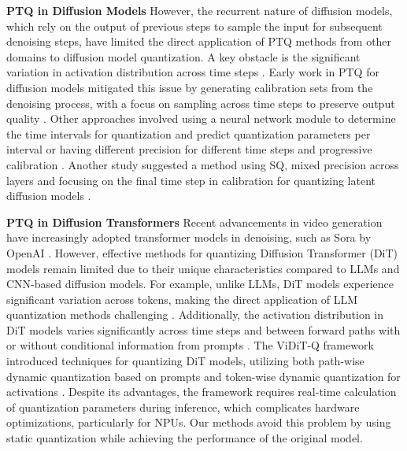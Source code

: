 \textbf{PTQ in Diffusion Models}
However, the recurrent nature of diffusion models, which rely on the output of previous steps to sample the input for subsequent denoising steps, have limited the direct application of PTQ methods from other domains to diffusion model quantization. A key obstacle is the significant variation in activation distribution across time steps \cite{shang2023posttrainingquantizationdiffusionmodels}. Early work in PTQ for diffusion models mitigated this issue by generating calibration sets from the denoising process, with a focus on sampling across time steps to preserve output quality \cite{shang2023posttrainingquantizationdiffusionmodels, li2023qdiffusionquantizingdiffusionmodels,liu2024enhanceddistributionalignmentposttraining}. Other approaches involved using a neural network module to determine the time intervals for quantization and predict quantization parameters per interval or having different precision for different time steps and progressive calibration \cite{so2023temporaldynamicquantizationdiffusion, he2023ptqdaccurateposttrainingquantization,tang2024posttrainingquantizationtexttoimagediffusion}. Another study suggested a method using SQ, mixed precision across layers and focusing on the final time step in calibration for quantizing latent diffusion models \cite{yang2023efficientquantizationstrategieslatent}.

\textbf{PTQ in Diffusion Transformers}
Recent advancements in video generation have increasingly adopted transformer models in denoising, such as Sora by OpenAI \cite{videoworldsimulators2024}. However, effective methods for quantizing Diffusion Transformer (DiT) models remain limited due to their unique characteristics compared to LLMs and CNN-based diffusion models. For example, unlike LLMs, DiT models experience significant variation across tokens, making the direct application of LLM quantization methods challenging \cite{zhu2024surveymodelcompressionlarge, zhao2024vidit}. Additionally, the activation distribution in DiT models varies significantly across time steps and between forward paths with or without conditional information from prompts \cite{zhao2024vidit}. The ViDiT-Q framework introduced techniques for quantizing DiT models, utilizing both path-wise dynamic quantization based on prompts and token-wise dynamic quantization for activations \cite{zhao2024vidit}. Despite its advantages, the framework requires real-time calculation of quantization parameters during inference, which complicates hardware optimizations, particularly for NPUs. Our methods avoid this problem by using static quantization while achieving the performance of the original model.

